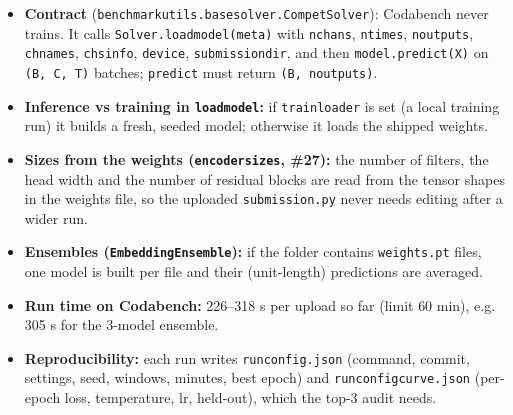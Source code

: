\documentclass[
  11pt,
]{article}
\providecommand{\tightlist}{%
  \setlength{\itemsep}{0pt}\setlength{\parskip}{0pt}}
\renewcommand{\_}{\oldunderscore\allowbreak}
\begin{document}
\begin{figure}[H]\centering
\begin{adjustbox}{max width=\linewidth, max totalheight=0.8\textheight}
\end{adjustbox}
\end{figure}

\begin{itemize}
\tightlist
\item
  \textbf{Contract}
  (\texttt{benchmark\_utils.base\_solver.CompetSolver}):
  Codabench never trains. It calls
  \texttt{Solver.load\_model(meta)} with
  \texttt{n\_chans}, \texttt{n\_times},
  \texttt{n\_outputs},
  \texttt{ch\_names},
  \texttt{chs\_info}, \texttt{device},
  \texttt{submission\_dir}, and then
  \texttt{model.predict(X)} on
  \texttt{(B,\ C,\ T)} batches;
  \texttt{predict} must return
  \texttt{(B,\ n\_outputs)}.
\item
  \textbf{Inference vs training in
  \texttt{load\_model}:} if
  \texttt{train\_loader} is set (a local
  training run) it builds a fresh,
  seeded model; otherwise it loads the
  shipped weights.
\item
  \textbf{Sizes from the weights
  (\texttt{encoder\_sizes}, \#27):} the
  number of filters, the head width and
  the number of residual blocks are read
  from the tensor shapes in the weights
  file, so the uploaded
  \texttt{submission.py} never needs
  editing after a wider run.
\item
  \textbf{Ensembles
  (\texttt{EmbeddingEnsemble}):} if the
  folder contains \texttt{weights\_*.pt}
  files, one model is built per file and
  their (unit-length) predictions are
  averaged.
\item
  \textbf{Run time on Codabench:}
  226--318 s per upload so far (limit 60
  min), e.g. 305 s for the 3-model
  ensemble.
\item
  \textbf{Reproducibility:} each run
  writes \texttt{run\_config.json}
  (command, commit, settings, seed,
  windows, minutes, best epoch) and
  \texttt{run\_config\_curve.json}
  (per-epoch loss, temperature, lr,
  held-out), which the top-3 audit
  needs.
\end{itemize}
\end{document}
